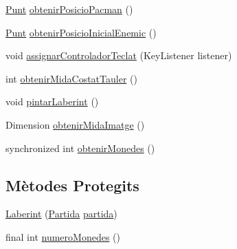 \begin{DoxyCompactItemize}
\item 
\hyperlink{classlogica_1_1_punt}{Punt} \hyperlink{classlogica_1_1laberints_1_1_laberint_a742e29f97d31bf39424e68a27d00dfda}{obtenir\+Posicio\+Pacman} ()
\item 
\hyperlink{classlogica_1_1_punt}{Punt} \hyperlink{classlogica_1_1laberints_1_1_laberint_ad42c2fd34f5287a44177544772fe06b8}{obtenir\+Posicio\+Inicial\+Enemic} ()
\item 
void \hyperlink{classlogica_1_1laberints_1_1_laberint_abbda03bcf4c8a1efead70f997d7357cb}{assignar\+Controlador\+Teclat} (Key\+Listener listener)
\item 
int \hyperlink{classlogica_1_1laberints_1_1_laberint_a9c8bcefff67ad264c9c68f3d77f951c8}{obtenir\+Mida\+Costat\+Tauler} ()
\item 
void \hyperlink{classlogica_1_1laberints_1_1_laberint_ab3dc6c50c9899e1efbe9bb8e2798718f}{pintar\+Laberint} ()
\item 
Dimension \hyperlink{classlogica_1_1laberints_1_1_laberint_a1007d6f98352b39e410eb505256e346d}{obtenir\+Mida\+Imatge} ()
\item 
synchronized int \hyperlink{classlogica_1_1laberints_1_1_laberint_abd37167c2c8d87ad1e9d0e177585b12b}{obtenir\+Monedes} ()
\end{DoxyCompactItemize}
\subsection*{Mètodes Protegits}
\begin{DoxyCompactItemize}
\item 
\hyperlink{classlogica_1_1laberints_1_1_laberint_acc391bde3e1696de4a510411f294b354}{Laberint} (\hyperlink{classlogica_1_1_partida}{Partida} \hyperlink{classlogica_1_1laberints_1_1_laberint_a7183ce070714f73e078bb36e8c21b575}{partida})
\item 
final int \hyperlink{classlogica_1_1laberints_1_1_laberint_a0eb77e8f02d64a81ce07dd6851c55603}{numero\+Monedes} ()
\end{DoxyCompactItemize}
